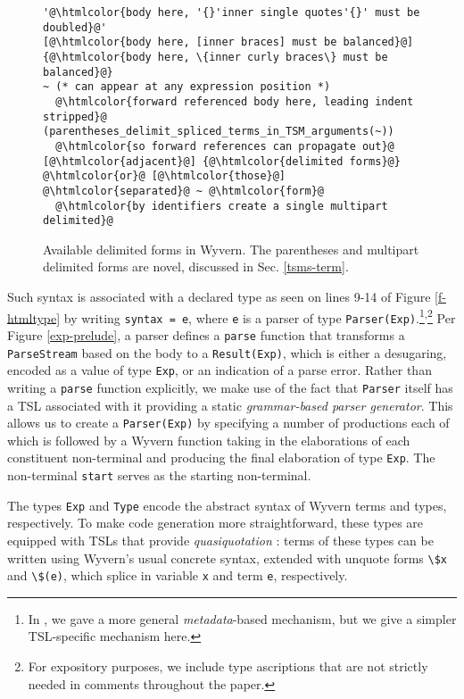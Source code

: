 \documentclass{sig-alternate}[10pt]
\newcommand{\htmlcolor}[1]{\textcolor[HTML]{339933}{#1}}
\newcommand{\mycaption}[1]{\vspace{-10px}\caption{#1}\vspace{-8px}}
\newcommand{\lstinlinew}[1]{\lstinline[style=wyvern]{#1}}
\begin{document}
\begin{figure}[t]
\begin{lstlisting}[style=wyvern,numbers=none,xleftmargin=0px,framexleftmargin=0px]
'@\htmlcolor{body here, '{}'inner single quotes'{}' must be doubled}@'
[@\htmlcolor{body here, [inner braces] must be balanced}@]
{@\htmlcolor{body here, \{inner curly braces\} must be balanced}@}
~ (* can appear at any expression position *)
  @\htmlcolor{forward referenced body here, leading indent stripped}@
(parentheses_delimit_spliced_terms_in_TSM_arguments(~)) 
  @\htmlcolor{so forward references can propagate out}@
[@\htmlcolor{adjacent}@] {@\htmlcolor{delimited forms}@} @\htmlcolor{or}@ [@\htmlcolor{those}@] @\htmlcolor{separated}@ ~ @\htmlcolor{form}@
  @\htmlcolor{by identifiers create a single multipart delimited}@
\end{lstlisting}
\mycaption{Available delimited forms in Wyvern. The parentheses and multipart delimited forms are novel, discussed in Sec. \ref{tsms-term}.}
\label{f-delimited}
\end{figure}

Such syntax is associated with a declared type as seen on lines 9-14 of Figure \ref{f-htmltype} by writing \lstinline[style=wyvern]{syntax = e}, where \lstinlinew{e} is a parser of type \lstinlinew{Parser(Exp)}.\footnote{ In \cite{TSLs}, we gave a more general \emph{metadata}-based mechanism, but we give a simpler TSL-specific mechanism here.}\textsuperscript{,}\footnote{ For expository purposes, we include type ascriptions that are not strictly needed in comments throughout the paper.} Per  Figure \ref{exp-prelude}, a parser defines a \lstinlinew{parse} function that transforms a \lstinlinew{ParseStream} based on the body to a \lstinlinew{Result(Exp)}, which is either a desugaring, encoded as a value of type \lstinlinew{Exp}, or an indication of a parse error. Rather than writing a \lstinlinew{parse} function explicitly, we make use of the fact that \lstinlinew{Parser} itself has a TSL associated with it providing a static \emph{grammar-based parser generator}. This allows us to create a \lstinlinew{Parser(Exp)} by specifying a number of productions each of which is followed by a Wyvern function taking in the elaborations of each constituent non-terminal and producing the final elaboration of type \lstinlinew{Exp}. The non-terminal \lstinlinew{start} serves as the starting non-terminal. 

The types \lstinlinew{Exp} and \lstinlinew{Type} encode the abstract syntax of Wyvern terms and types, respectively. To make code generation more straightforward, these types are equipped with TSLs that provide \emph{quasiquotation}  \cite{quine40book,Bawd99a,ScalaMacros2013}: terms of these types  can be written using Wyvern's usual concrete syntax, extended with unquote forms \lstinlinew{\$x} and \lstinlinew{\$(e)}, which splice in variable \lstinlinew{x} and  term \lstinlinew{e}, respectively. %
\end{document}
